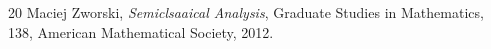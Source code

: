 
\begin{thebibliography}{20} 
     Maciej Zworski,
    \textit{Semiclsaaical Analysis}, 
    Graduate Studies in Mathematics, 138, 
    American Mathematical Society, 
    2012. 
\end{thebibliography}






